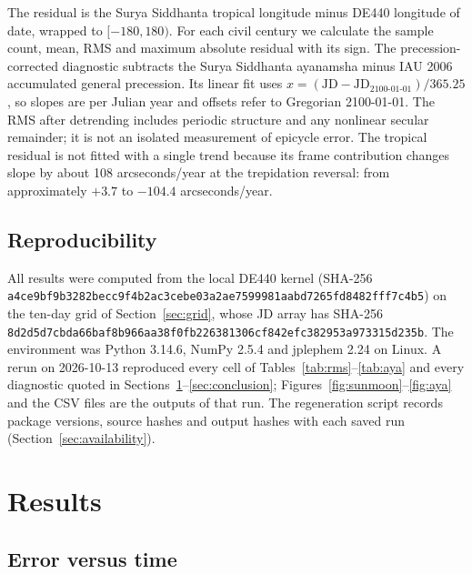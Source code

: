 \documentclass[11pt,a4paper]{article}
\begin{document}
The residual is the Surya Siddhanta tropical longitude minus DE440 longitude of date, wrapped to $[-180, 180)$. For each civil century we calculate the sample count, mean, RMS and maximum absolute residual with its sign. The precession-corrected diagnostic subtracts the Surya Siddhanta ayanamsha minus IAU 2006 accumulated general precession. Its linear fit uses $x = (\mathrm{JD} - \mathrm{JD}_{2100\text{-}01\text{-}01})/365.25$, so slopes are per Julian year and offsets refer to Gregorian 2100-01-01. The RMS after detrending includes periodic structure and any nonlinear secular remainder; it is not an isolated measurement of epicycle error. The tropical residual is not fitted with a single trend because its frame contribution changes slope by about 108 arcseconds/year at the trepidation reversal: from approximately $+3.7$ to $-104.4$ arcseconds/year.

\subsection{Reproducibility}

All results were computed from the local DE440 kernel (SHA-256 \texttt{a4ce9bf9\allowbreak b3282bec\allowbreak c9f4b2ac\allowbreak 3cebe03a\allowbreak 2ae75999\allowbreak 81aabd72\allowbreak 65fd8482\allowbreak fff7c4b5}) on the ten-day grid of Section~\ref{sec:grid}, whose JD array has SHA-256 \texttt{8d2d5d7c\allowbreak bda66baf\allowbreak 8b966aa3\allowbreak 8f0fb226\allowbreak 381306cf\allowbreak 842efc38\allowbreak 2953a973\allowbreak 315d235b}. The environment was Python 3.14.6, NumPy 2.5.4 and jplephem 2.24 on Linux. A rerun on 2026-10-13 reproduced every cell of Tables~\ref{tab:rms}--\ref{tab:aya} and every diagnostic quoted in Sections~\ref{sec:results}--\ref{sec:conclusion}; Figures~\ref{fig:sunmoon}--\ref{fig:aya} and the CSV files are the outputs of that run. The regeneration script records package versions, source hashes and output hashes with each saved run (Section~\ref{sec:availability}).

\section{Results}
\label{sec:results}

\subsection{Error versus time}
\end{document}
